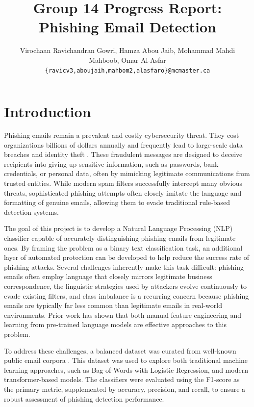 \documentclass[11pt]{article}
\title{Group 14 Progress Report:\\Phishing Email Detection}
\author{Virochaan Ravichandran Gowri, Hamza Abou Jaib, Mohammad Mahdi Mahboob, Omar Al-Asfar \\
  \texttt{\{ravicv3,aboujaih,mahbom2,alasfaro\}@mcmaster.ca} }
\begin{document}
\maketitle

\section{Introduction}


Phishing emails remain a prevalent and costly cybersecurity threat. They cost organizations billions of dollars annually and frequently lead to large-scale data breaches and identity theft \citep{Almomani2013}. These fraudulent messages are designed to deceive recipients into giving up sensitive information, such as passwords, bank credentials, or personal data, often by mimicking legitimate communications from trusted entities. While modern spam filters successfully intercept many obvious threats, sophisticated phishing attempts often closely imitate the language and formatting of genuine emails, allowing them to evade traditional rule-based detection systems.

The goal of this project is to develop a Natural Language Processing (NLP) classifier capable of accurately distinguishing phishing emails from legitimate ones. By framing the problem as a binary text classification task, an additional layer of automated protection can be developed to help reduce the success rate of phishing attacks. Several challenges inherently make this task difficult: phishing emails often employ language that closely mirrors legitimate business correspondence, the linguistic strategies used by attackers evolve continuously to evade existing filters, and class imbalance is a recurring concern because phishing emails are typically far less common than legitimate emails in real-world environments. Prior work has shown that both manual feature engineering \citep{Fette2007} and learning from pre-trained language models \citep{Devlin2019} are effective approaches to this problem.

To address these challenges, a balanced dataset was curated from well-known public email corpora \citep{Champa2024}. This dataset was used to explore both traditional machine learning approaches, such as Bag-of-Words with Logistic Regression, and modern transformer-based models. The classifiers were evaluated using the F1-score as the primary metric, supplemented by accuracy, precision, and recall, to ensure a robust assessment of phishing detection performance.
\end{document}
